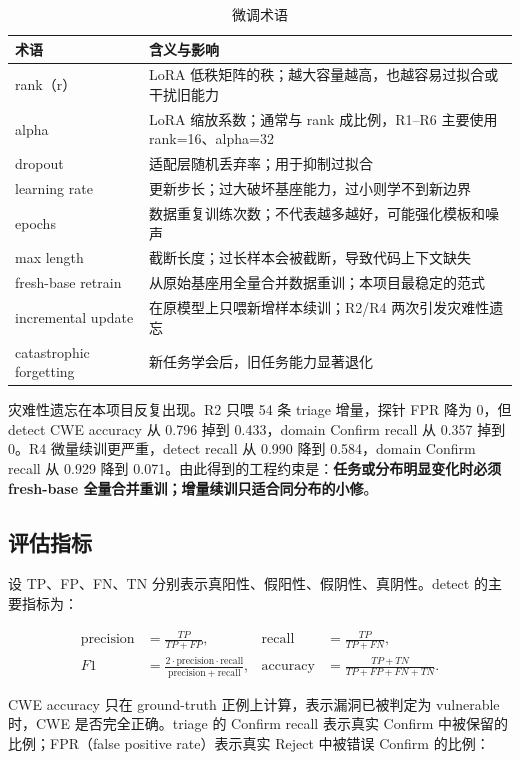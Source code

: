 \documentclass[UTF8,11pt,fontset=none]{ctexart}
\begin{document}
\begin{table}[h]
\centering
\caption{微调术语}
\label{tab:finetune-zh}
\small
\begin{tabularx}{\linewidth}{L{3.0cm}Y}
\toprule
\textbf{术语} & \textbf{含义与影响} \\
\midrule
rank（r） & LoRA 低秩矩阵的秩；越大容量越高，也越容易过拟合或干扰旧能力 \\
alpha & LoRA 缩放系数；通常与 rank 成比例，R1--R6 主要使用 rank=16、alpha=32 \\
dropout & 适配层随机丢弃率；用于抑制过拟合 \\
learning rate & 更新步长；过大破坏基座能力，过小则学不到新边界 \\
epochs & 数据重复训练次数；不代表越多越好，可能强化模板和噪声 \\
max length & 截断长度；过长样本会被截断，导致代码上下文缺失 \\
fresh-base retrain & 从原始基座用全量合并数据重训；本项目最稳定的范式 \\
incremental update & 在原模型上只喂新增样本续训；R2/R4 两次引发灾难性遗忘 \\
catastrophic forgetting & 新任务学会后，旧任务能力显著退化 \\
\bottomrule
\end{tabularx}
\end{table}

灾难性遗忘在本项目反复出现。R2 只喂 54 条 triage 增量，探针 FPR 降为 0，但 detect CWE accuracy 从 0.796 掉到 0.433，domain Confirm recall 从 0.357 掉到 0。R4 微量续训更严重，detect recall 从 0.990 降到 0.584，domain Confirm recall 从 0.929 降到 0.071。由此得到的工程约束是：\textbf{任务或分布明显变化时必须 fresh-base 全量合并重训；增量续训只适合同分布的小修}。

\subsection{评估指标}

设 TP、FP、FN、TN 分别表示真阳性、假阳性、假阴性、真阴性。detect 的主要指标为：

\begin{align}
\mathrm{precision} &= \frac{TP}{TP+FP},&
\mathrm{recall} &= \frac{TP}{TP+FN},\\
F1 &= \frac{2\cdot \mathrm{precision}\cdot \mathrm{recall}}{\mathrm{precision}+\mathrm{recall}},&
\mathrm{accuracy} &= \frac{TP+TN}{TP+FP+FN+TN}.
\end{align}

CWE accuracy 只在 ground-truth 正例上计算，表示漏洞已被判定为 vulnerable 时，CWE 是否完全正确。triage 的 Confirm recall 表示真实 Confirm 中被保留的比例；FPR（false positive rate）表示真实 Reject 中被错误 Confirm 的比例：
\end{document}
